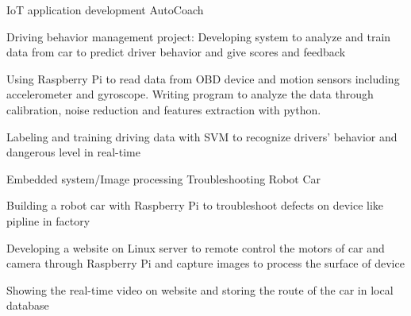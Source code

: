 
\begin{cventries}
  \cventry
    {IoT application development} %
    {AutoCoach} %
    {} %
    {} %
    {
      \begin{cvitems} %
        \item { Driving behavior management project: Developing system to analyze and train data from car to predict driver behavior and give scores and feedback}
        \item {Using Raspberry Pi to read data from OBD device and motion sensors including accelerometer and gyroscope. Writing program to analyze the data through calibration, noise reduction and features extraction with python.}
        \item {Labeling and training driving data with SVM to recognize drivers' behavior and dangerous level in real-time}
      \end{cvitems}
    }

  \cventry
    {Embedded system/Image processing} %
    {Troubleshooting Robot Car} %
    {} %
    {} %
    {
      \begin{cvitems} %
      	\item {Building a robot car with Raspberry Pi to troubleshoot defects on device like pipline in factory }
      	\item {Developing a website on Linux server to remote control the motors of car and camera through Raspberry Pi and capture images to process the surface of device}
		\item {Showing the real-time video on website and storing the route of the car in local database}
      \end{cvitems}
    }
\end{cventries}